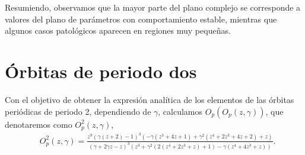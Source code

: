 Resumiendo, observamos que la mayor parte del plano complejo se corresponde a valores del plano de parámetros con comportamiento estable, mientras que algunos casos patológicos aparecen en regiones muy pequeñas.

%
%


\section{Órbitas de periodo dos}

Con el objetivo de obtener la expresión analítica de los elementos de las órbitas periódicas de periodo 2, dependiendo de $\gamma$, calculamos $O_{p}(O_{p}(z,\gamma))$, que denotaremos como $O_{p}^2(z,\gamma)$,
{\small\begin{align*}
	&O_{p}^2(z,\gamma)=\frac{z^9 (\gamma  (z+2)-1)^3 \left(-\gamma  \left(z^3+4 z+1\right)+\gamma ^2 \left(z^4+2 z^3+4 z+2\right)+z\right)}{(\gamma +2 \gamma  z-z)^3 \left(z^3+\gamma ^2 \left(2 \left(z^4+2 z^3+z\right)+1\right)-\gamma  \left(z^4+4 z^3+z\right)\right)}.
	\end{align*}}

